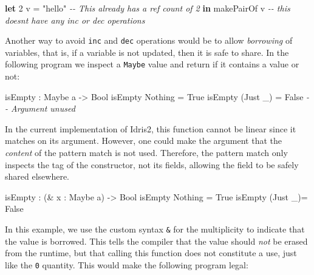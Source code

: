 \documentclass[
]{article}
\newenvironment{Shaded}{}{}
\newcommand{\CommentTok}[1]{\textcolor[rgb]{0.38,0.63,0.69}{\textit{#1}}}
\newcommand{\DataTypeTok}[1]{\textcolor[rgb]{0.56,0.13,0.00}{#1}}
\newcommand{\DecValTok}[1]{\textcolor[rgb]{0.25,0.63,0.44}{#1}}
\newcommand{\KeywordTok}[1]{\textcolor[rgb]{0.00,0.44,0.13}{\textbf{#1}}}
\newcommand{\NormalTok}[1]{#1}
\newcommand{\OperatorTok}[1]{\textcolor[rgb]{0.40,0.40,0.40}{#1}}
\newcommand{\OtherTok}[1]{\textcolor[rgb]{0.00,0.44,0.13}{#1}}
\newcommand{\StringTok}[1]{\textcolor[rgb]{0.25,0.44,0.63}{#1}}
\begin{document}
\begin{Shaded}
\begin{Highlighting}[]
\KeywordTok{let} \DecValTok{2}\NormalTok{ v }\OtherTok{=} \StringTok{"hello"} \CommentTok{{-}{-} This already has a ref count of 2}
 \KeywordTok{in}\NormalTok{ makePairOf v }\CommentTok{{-}{-} this doesn\textquotesingle{}t have any inc or dec operations}
\end{Highlighting}
\end{Shaded}

Another way to avoid \texttt{inc} and \texttt{dec} operations would be
to allow \emph{borrowing} of variables, that is, if a variable is not
updated, then it is safe to share. In the following program we inspect a
\texttt{Maybe} value and return if it contains a value or not:

\begin{Shaded}
\begin{Highlighting}[]
\NormalTok{isEmpty }\OperatorTok{:} \DataTypeTok{Maybe}\NormalTok{ a }\OtherTok{{-}\textgreater{}} \DataTypeTok{Bool}
\NormalTok{isEmpty }\DataTypeTok{Nothing} \OtherTok{=} \DataTypeTok{True}
\NormalTok{isEmpty (}\DataTypeTok{Just}\NormalTok{ \_) }\OtherTok{=} \DataTypeTok{False} \CommentTok{{-}{-} Argument unused}
\end{Highlighting}
\end{Shaded}

In the current implementation of Idris2, this function cannot be linear
since it matches on its argument. However, one could make the argument
that the \emph{content} of the pattern match is not used. Therefore, the
pattern match only inspects the tag of the constructor, not its fields,
allowing the field to be safely shared elsewhere.

\begin{Shaded}
\begin{Highlighting}[]
\NormalTok{isEmpty }\OperatorTok{:}\NormalTok{ (}\OperatorTok{\&}\NormalTok{ x }\OperatorTok{:} \DataTypeTok{Maybe}\NormalTok{ a) }\OtherTok{{-}\textgreater{}} \DataTypeTok{Bool}
\NormalTok{isEmpty }\DataTypeTok{Nothing} \OtherTok{=} \DataTypeTok{True}
\NormalTok{isEmpty (}\DataTypeTok{Just}\NormalTok{ \_)}\OtherTok{=} \DataTypeTok{False}
\end{Highlighting}
\end{Shaded}

In this example, we use the custom syntax \texttt{\&} for the
multiplicity to indicate that the value is borrowed. This tells the
compiler that the value should \emph{not} be erased from the runtime,
but that calling this function does not constitute a use, just like the
\texttt{0} quantity. This would make the following program legal:
\end{document}
